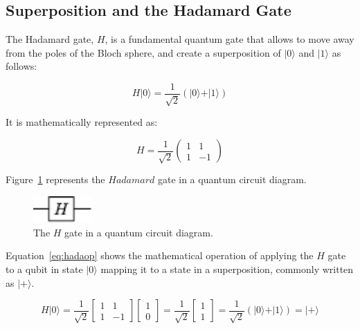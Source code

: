 \subsection{Superposition and the Hadamard Gate}
\label{sec:hada}

The Hadamard gate, $H$, is a fundamental quantum gate that allows to move away 
from the poles of the Bloch sphere, and create a superposition of $\vert 0 \rangle$ 
and $\vert 1 \rangle$ as follows:

\begin{linenomath}
\begin{equation}
H \vert 0 \rangle = \frac{1}{\sqrt{2}}(\vert 0 \rangle + \vert 1 \rangle)
\label{eq:hadamap}
\end{equation}
\end{linenomath}

It is mathematically represented as:

\begin{linenomath}
\begin{equation}
H = \frac{1}{\sqrt{2}} \begin{pmatrix}
1 & 1 \\
1 & -1
\end{pmatrix}
\label{eq:hada}
\end{equation}
\end{linenomath}

Figure~\ref{fig:hada} represents the $Hadamard$ gate in a quantum circuit diagram.

\begin{figure}[!htbp]
\centering
	\includegraphics[width=0.20\textwidth]{figures/H.pdf}
\caption{The $H$ gate in a quantum circuit diagram.}
\label{fig:hada}
\end{figure}

Equation~\ref{eq:hadaop} shows the mathematical operation of applying the $H$
gate to a qubit in state $\vert 0 \rangle$ mapping it to a state in a superposition,
commonly written as $\vert + \rangle$.

\begin{linenomath}
\begin{equation}
H\vert 0 \rangle=\frac{1}{\sqrt{2}}\begin{bmatrix} 1 & 1 \\ 1 & -1 \end{bmatrix} \begin{bmatrix} 1 \\ 0 \end{bmatrix} = \frac{1}{\sqrt{2}}\begin{bmatrix} 1 \\ 1 \end{bmatrix} = \frac{1}{\sqrt{2}} (\vert 0 \rangle + \vert 1 \rangle) = \vert + \rangle
\label{eq:hadaop}
\end{equation}
\end{linenomath}

